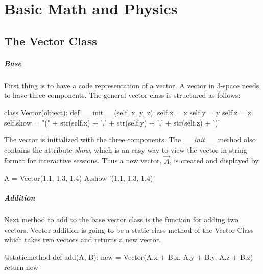 \documentclass[15pt]{report}
\begin{document}


\chapter{Basic Math and Physics}

\section{The Vector Class}
\paragraph{Base} First thing is to have a code representation of a vector. A vector in 3-space needs to have three components. The general vector class is structured as follows:

\begin{code}

class Vector(object):
    def __init__(self, x, y, z):
        self.x = x
        self.y = y
        self.z = z
        self.show = "(" + str(self.x) + ',' + str(self.y) + ',' + str(self.z) + ')'
           

\end{code}

The vector is initialized with the three components. The \textit{\_\_init\_\_} method also contains the attribute \textit{show}, which is an easy way to view the vector in string format for interactive sessions. Thus a new vector, $\vec{A}$, is created and displayed by

\begin{code}
A = Vector(1.1, 1.3, 1.4)
A.show
'(1.1, 1.3, 1.4)'
\end{code}

\paragraph{Addition} Next method to add to the base vector class is the function for adding two vectors. Vector addition is going to be a static class method of the Vector Class which takes two vectors and returns a new vector.

\begin{code}
    @staticmethod
    def add(A, B):
        new = Vector(A.x + B.x, 
                     A.y + B.y,
                     A.z + B.z)
        return new
\end{code}
\end{document}
